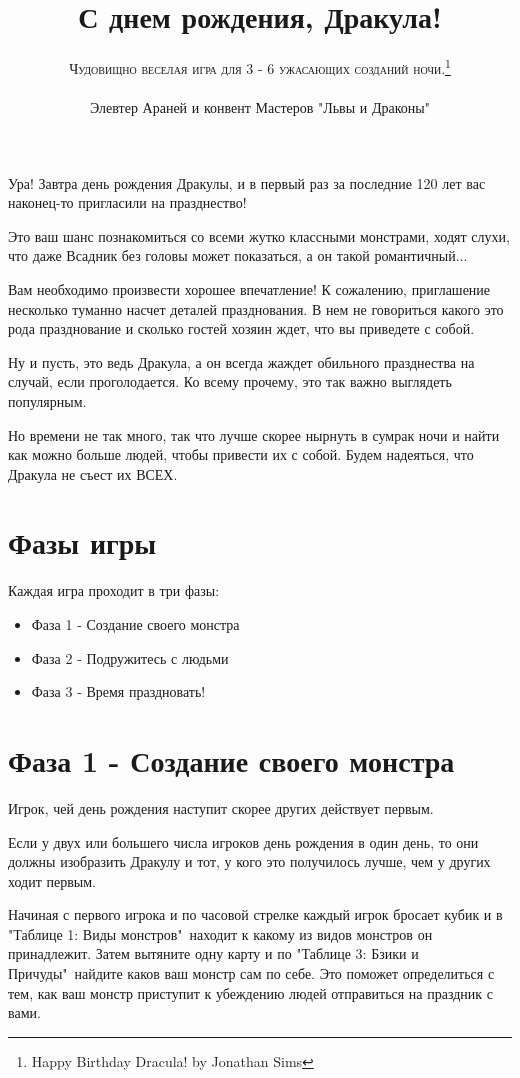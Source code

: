 \documentclass[twoside,twocolumn]{article}
\title{С днем рождения, Дракула!} %
\author{\textsc{Чудовищно веселая игра для 3 - 6 ужасающих созданий ночи.}\thanks{Happy Birthday Dracula! by Jonathan Sims} \\[1ex] \\ %
\normalsize {Элевтер Араней и конвент Мастеров "Львы и Драконы"}
}
\date{} 								%
\begin{document}
\renewcommand{\abstractname}{\vspace{-\baselineskip}}

\maketitle

Ура! Завтра день рождения Дракулы, и в первый раз за последние 120 лет вас наконец-то пригласили на празднество!

Это ваш шанс познакомиться со всеми жутко классными монстрами, ходят слухи, что даже Всадник без головы может показаться, а он такой романтичный...

Вам необходимо произвести хорошее впечатление! К сожалению, приглашение несколько туманно насчет деталей празднования.
В нем не говориться какого это рода празднование и сколько гостей хозяин ждет, что вы приведете с собой.

Ну и пусть, это ведь Дракула, а он всегда жаждет обильного празднества на случай, если проголодается.
Ко всему прочему, это так важно выглядеть популярным.

Но времени не так много, так что лучше скорее нырнуть в сумрак ночи и найти как можно больше людей, чтобы привести их с собой.
Будем надеяться, что Дракула не съест их ВСЕХ.

\section*{Фазы игры}
Каждая игра проходит в три фазы:
\begin{itemize}
   \item Фаза 1 - Создание своего монстра
   \item Фаза 2 - Подружитесь с людьми
   \item Фаза 3 - Время праздновать!
\end{itemize}

\section*{Фаза 1 - Создание своего монстра}
Игрок, чей день рождения наступит скорее других действует первым.

Если у двух или большего числа игроков день рождения в один день, то они должны изобразить Дракулу и тот, у кого это получилось лучше, чем у других ходит первым.

Начиная с первого игрока и по часовой стрелке каждый игрок бросает кубик и в "Таблице 1: Виды монстров"\  находит к какому из видов монстров он принадлежит. Затем вытяните одну карту и по "Таблице 3: Бзики и Причуды"\ найдите каков ваш монстр сам по себе. Это поможет определиться с тем, как ваш монстр приступит к убеждению людей отправиться на праздник с вами.
\end{document}
